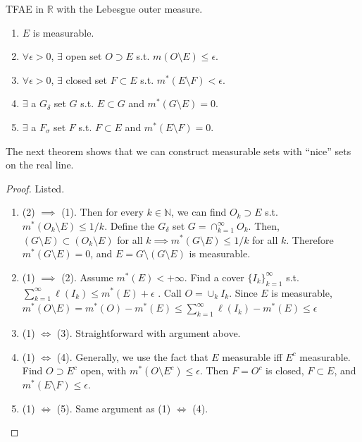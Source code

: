   \begin{theorem}
    TFAE in $\mathbb{R}$ with the Lebesgue outer measure. 
    \begin{enumerate}
      \item $E$ is measurable. 
      \item $\forall \epsilon > 0$, $\exists$ open set $O \supset E$  s.t. $m(O \setminus E) \leq \epsilon$. 
      \item $\forall \epsilon > 0$, $\exists$ closed set $F \subset E$ s.t. $m^\ast (E \setminus F) < \epsilon$. 
      \item $\exists$ a $G_\delta$ set $G$ s.t. $E \subset G$ and $m^\ast (G \setminus E) = 0$. 
      \item $\exists$ a $F_\sigma$ set $F$ s.t. $F \subset E$ and $m^\ast (E \setminus F) = 0$. 
    \end{enumerate}
    The next theorem shows that we can construct measurable sets with ``nice'' sets on the real line. 
  \end{theorem}
  \begin{proof}
    Listed. 
    \begin{enumerate}
      \item (2) $\implies$ (1). Then for every $k \in \mathbb{N}$, we can find $O_k \supset E$ s.t. $m^\ast (O_k \setminus E) \leq 1/k$. Define the $G_\delta$ set $G = \cap_{k=1}^\infty O_k$. Then, $(G \setminus E) \subset (O_k \setminus E)$ for all $k \implies m^\ast (G \setminus E) \leq 1/k$ for all $k$. Therefore $m^\ast (G \setminus E) = 0$, and $E = G \setminus (G \setminus E)$ is measurable. 

      \item (1) $\implies$ (2). Assume $m^\ast (E) < +\infty$. Find a cover $\{I_k \}_{k=1}^\infty$ s.t. $\sum_{k=1}^\infty \ell (I_k) \leq m^\ast (E) + \epsilon$ . Call $O = \cup_k I_k$. Since $E$ is measurable, $m^\ast (O \setminus E) = m^\ast (O) - m^\ast (E) \leq \sum_{k=1}^\infty \ell(I_k) - m^\ast (E) \leq \epsilon$ 

      \item (1) $\iff$ (3). Straightforward with argument above.  

      \item (1) $\iff$ (4). Generally, we use the fact that $E$ measurable iff $E^c$ measurable. Find $O \supset E^c$ open, with $m^\ast (O \setminus E^c) \leq \epsilon$. Then $F = O^c$ is closed, $F \subset E$, and $m^\ast (E \setminus F) \leq \epsilon$. 

      \item (1) $\iff$ (5). Same argument as (1) $\iff$ (4). 
    \end{enumerate}
  \end{proof}

